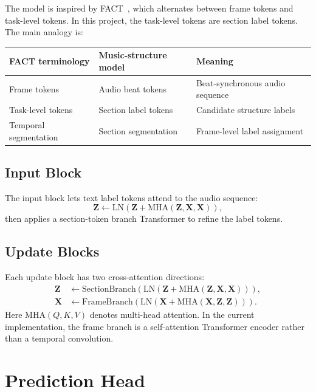 \documentclass[11pt,a4paper]{article}
\newcommand{\audiohid}{\mathbf{X}}
\newcommand{\texthid}{\mathbf{Z}}
\begin{document}
The model is inspired by FACT~\cite{lu2024fact}, which alternates between frame tokens
and task-level tokens. In this project, the task-level tokens are section label tokens.
The main analogy is:
\begin{center}
\begin{tabular}{lll}
\toprule
FACT terminology & Music-structure model & Meaning \\
\midrule
Frame tokens & Audio beat tokens & Beat-synchronous audio sequence \\
Task-level tokens & Section label tokens & Candidate structure labels \\
Temporal segmentation & Section segmentation & Frame-level label assignment \\
\bottomrule
\end{tabular}
\end{center}

\subsection{Input Block}

The input block lets text label tokens attend to the audio sequence:
\begin{equation}
  \texthid \leftarrow
  \mathrm{LN}\left(
    \texthid + \mathrm{MHA}(\texthid, \audiohid, \audiohid)
  \right),
\end{equation}
then applies a section-token branch Transformer to refine the label tokens.

\subsection{Update Blocks}

Each update block has two cross-attention directions:
\begin{align}
  \texthid &\leftarrow
  \mathrm{SectionBranch}\left(
    \mathrm{LN}\left(
      \texthid + \mathrm{MHA}(\texthid, \audiohid, \audiohid)
    \right)
  \right), \\
  \audiohid &\leftarrow
  \mathrm{FrameBranch}\left(
    \mathrm{LN}\left(
      \audiohid + \mathrm{MHA}(\audiohid, \texthid, \texthid)
    \right)
  \right).
\end{align}
Here $\mathrm{MHA}(Q,K,V)$ denotes multi-head attention. In the current
implementation, the frame branch is a self-attention Transformer encoder rather than a
temporal convolution.

\section{Prediction Head}
\end{document}
